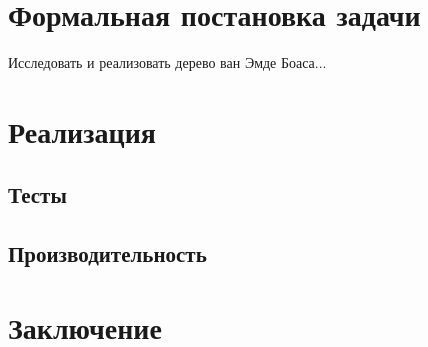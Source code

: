 \documentclass{article}
\begin{document}
\section{Формальная постановка задачи}
Исследовать и реализовать дерево ван Эмде Боаса...
\section{Реализация}
\subsection{Тесты}
\subsection{Производительность}
\section{Заключение}




\end{document}
